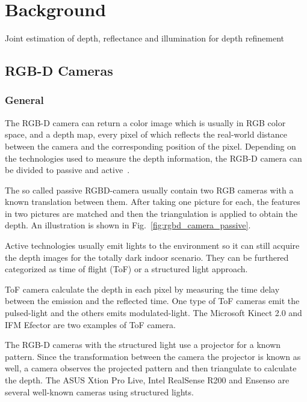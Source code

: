 \chapter{Background} \label{chap:background}
Joint estimation of depth, reflectance and illumination for depth refinement

\section{RGB-D Cameras}

\subsection{General}

The RGB-D camera can return a color image which is usually in RGB color space, and a depth map, every pixel of which reflects the real-world distance between the camera and the corresponding position of the pixel.
Depending on the technologies used to measure the depth information, the RGB-D camera can be divided to passive and active~\cite{kerl2012msc}.

The so called passive RGBD-camera usually contain two RGB cameras with a known translation between them.
After taking one picture for each, the features in two pictures are matched and then the triangulation is applied to obtain the depth.
An illustration is shown in Fig.~\ref{fig:rgbd_camera_passive}.

Active technologies usually emit lights to the environment so it can still acquire the depth images for the totally dark indoor scenario.
They can be furthered categorized as time of flight (ToF) or a structured light approach.

ToF camera calculate the depth in each pixel by measuring the time delay between the emission and the reflected time.
One type of ToF cameras emit the pulsed-light and the others emits modulated-light.
The Microsoft Kinect 2.0 and IFM Efector are two examples of ToF camera.

The RGB-D cameras with the structured light use a projector for a known pattern. 
Since the transformation between the camera the projector is known as well, a camera observes the projected pattern and then triangulate to calculate the depth.
The ASUS Xtion Pro Live, Intel RealSense R200 and Ensenso are several well-known cameras using structured lights.

